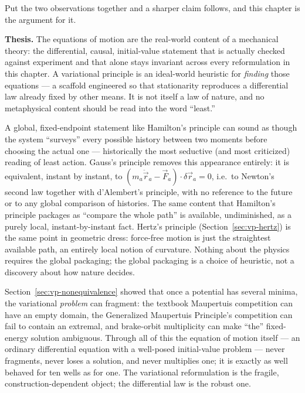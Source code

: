Put the two observations together and a sharper claim follows, and this chapter
is the argument for it.

\begin{motto}
\textbf{Thesis.} The equations of motion are the real-world content of a
    mechanical theory: the differential, causal, initial-value statement that
    is actually checked against experiment and that alone stays invariant
    across every reformulation in this chapter. A variational principle is an
    ideal-world heuristic for \emph{finding} those equations --- a scaffold
    engineered so that stationarity reproduces a differential law already fixed
    by other means. It is not itself a law of nature, and no metaphysical
    content should be read into the word ``least.''
\end{motto}

A global, fixed-endpoint statement like Hamilton's principle can sound as
    though the system ``surveys'' every possible history between two moments
    before choosing the actual one --- historically the most seductive (and
    most criticized) reading of least action. Gauss's principle removes this
    appearance entirely:  it is 
    equivalent, instant by instant, to $(m_a\ddot{\vec r}_a-\vec
    F_a)\cdot\delta\vec r_a=0$, i.e.\ to Newton's second law together with
    d'Alembert's principle, with no reference to the future or to any global
    comparison of histories. The same content that Hamilton's principle
    packages as ``compare the whole path'' is available, undiminished, as a
    purely local, instant-by-instant fact. Hertz's principle
    (Section~\ref{sec:vp-hertz}) is the same point in geometric dress: force-free
    motion is just the straightest available path, an entirely local notion of
    curvature. Nothing about the physics requires the global packaging; the
    global packaging is a choice of heuristic, not a discovery about how nature
    decides.

Section~\ref{sec:vp-nonequivalence} showed that once a potential has several
    minima, the variational \emph{problem} can fragment: the textbook
    Maupertuis competition can have an empty domain, the Generalized Maupertuis
    Principle's competition can fail to contain an extremal, and brake-orbit
    multiplicity can make ``the'' fixed-energy solution ambiguous. Through all
    of this the equation of motion itself --- an ordinary differential equation
    with a well-posed initial-value problem --- never fragments, never loses a
    solution, and never multiplies one; it is exactly as well behaved for ten
    wells as for one. The variational reformulation is the fragile,
    construction-dependent object; the differential law is the robust one.

